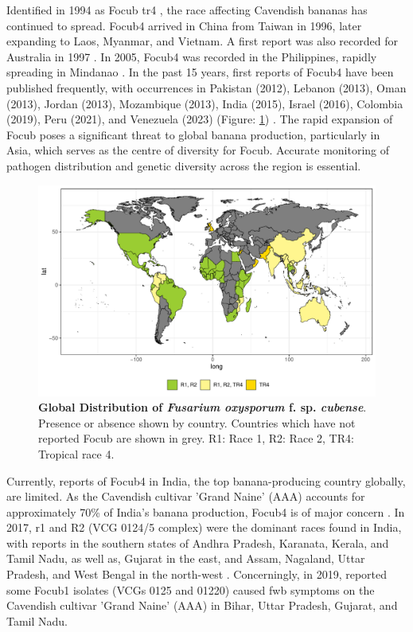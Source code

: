 Identified in 1994 as \ac{Focub} \acf{tr4} \parencite{Ploetz1994}, the race affecting Cavendish bananas has continued to spread. \Ac{Focub4} arrived in China from Taiwan in 1996, later expanding to Laos, Myanmar, and Vietnam. A first report was also recorded for Australia in 1997 \parencite{Ploetz2015a}. In 2005, \ac{Focub4} was recorded in the Philippines, rapidly spreading in Mindanao \parencite{Molina2009}. In the past 15 years, first reports of \ac{Focub4} have been published frequently, with occurrences in Pakistan (2012), Lebanon (2013), Oman (2013), Jordan (2013), Mozambique (2013), India (2015), Israel (2016), Colombia (2019), Peru (2021), and Venezuela (2023) (Figure: \ref{fig:FocDis}) \parencite{Butler2013, Ploetz2015a, Ordonez2015b, Zheng2018, Thangavelu2019, Garcia-Bastida2020, Maymon2020, Kema2021, Acuna2022,  Herrera2023}.  The rapid expansion of \ac{Focub} poses a significant threat to global banana production, particularly in Asia, which serves as the centre of diversity for \ac{Focub}. Accurate monitoring of pathogen distribution and genetic diversity across the region is essential.  
\begin{figure}[h!]
  \includegraphics[width=14.5cm]{Figures/FocDis.pdf}
  \caption[Global Distribution of \textit{Fusarium oxysporum} f. sp. \textit{cubense}]{\textbf{Global Distribution of \textit{Fusarium oxysporum} f. sp. \textit{cubense}}. Presence or absence shown by country. Countries which have not reported \ac{Focub} are shown in grey. R1: Race 1, R2: Race 2, TR4: Tropical race 4.}
  \label{fig:FocDis}
\end{figure}

\vbox{
Currently, reports of \ac{Focub4} in India, the top banana-producing country globally, are limited. As the Cavendish cultivar 'Grand Naine' (AAA) accounts for approximately 70\% of India's banana production, \ac{Focub4} is of major concern \parencite{Damodaran2019}.  In 2017, \ac{r1} and R2 (VCG 0124/5 complex) were the dominant races found in India, with reports in the southern states of Andhra Pradesh, Karanata, Kerala, and Tamil Nadu, as well as, Gujarat in the east, and Assam, Nagaland, Uttar Pradesh, and West Bengal in the north-west \parencite{Mostert2017, Thangavelu2020}. Concerningly, in 2019, \textcite{Thangavelu2020} reported some \ac{Focub1} isolates (VCGs 0125 and 01220) caused \ac{fwb} symptoms on the Cavendish cultivar 'Grand Naine' (AAA) in Bihar, Uttar Pradesh, Gujarat, and Tamil Nadu. }

